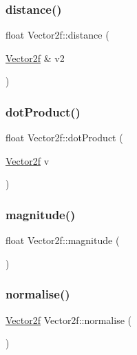 \mbox{\label{class_vector2f_a187880c306ea98069a7286a320435eb6}} 
\subsubsection{\texorpdfstring{distance()}{distance()}\hspace{0.1cm}{\footnotesize\ttfamily [2/2]}}
{\footnotesize\ttfamily float Vector2f\+::distance (\begin{DoxyParamCaption}\item[{\mbox{\hyperlink{class_vector2f}{Vector2f}} \&}]{v2 }\end{DoxyParamCaption})}

\mbox{\label{class_vector2f_a909b67d994afb50a2c77b9fa45681914}} 
\subsubsection{\texorpdfstring{dotProduct()}{dotProduct()}}
{\footnotesize\ttfamily float Vector2f\+::dot\+Product (\begin{DoxyParamCaption}\item[{\mbox{\hyperlink{class_vector2f}{Vector2f}}}]{v }\end{DoxyParamCaption})}

\mbox{\label{class_vector2f_a1e8682f591032c92c6f4c33100d36789}} 
\subsubsection{\texorpdfstring{magnitude()}{magnitude()}}
{\footnotesize\ttfamily float Vector2f\+::magnitude (\begin{DoxyParamCaption}{ }\end{DoxyParamCaption})}

\mbox{\label{class_vector2f_aa154fbe174de5ab0ba9a4cf9422cd366}} 
\subsubsection{\texorpdfstring{normalise()}{normalise()}}
{\footnotesize\ttfamily \mbox{\hyperlink{class_vector2f}{Vector2f}} Vector2f\+::normalise (\begin{DoxyParamCaption}{ }\end{DoxyParamCaption})}

